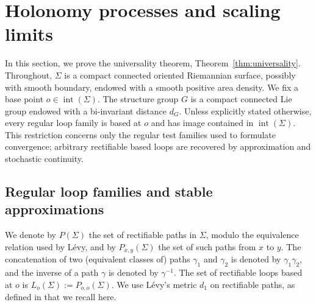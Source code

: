 \documentclass[11pt,a4paper,reqno]{article}
\theoremstyle{definition}
\theoremstyle{remark}
\begin{document}
\section{Holonomy processes and scaling limits}
\label{sec:loop-space-regular-processes}

In this section, we prove the universality theorem, Theorem~\ref{thm:universality}. Throughout, $\Sigma$ is a compact connected oriented Riemannian surface, possibly with smooth boundary, endowed with a smooth positive area density. We fix a base point $o\in\operatorname{int}(\Sigma).$ The structure group $G$ is a compact connected Lie group endowed with a bi-invariant distance $d_G$. Unless explicitly stated otherwise, every regular loop family is based at $o$ and has image contained in $\operatorname{int}(\Sigma)$. This restriction concerns only the regular test families used to formulate convergence; arbitrary rectifiable based loops are recovered by approximation and stochastic continuity.

\subsection{Regular loop families and stable approximations}

We denote by $P(\Sigma)$ the set of rectifiable paths in $\Sigma$, modulo the equivalence relation used by L\'evy, and by $P_{x,y}(\Sigma)$ the set of such paths from $x$ to $y$. The concatenation of two (equivalent classes of) paths $\gamma_1$ and $\gamma_2$ is denoted by $\gamma_1\gamma_2$, and the inverse of a path $\gamma$ is denoted by $\gamma^{-1}$. The set of rectifiable loops based at $o$ is $L_o(\Sigma):=P_{o,o}(\Sigma).$ We use L\'evy's metric $d_1$ on rectifiable paths, as defined in \cite[Section~1.2.2]{Lev10} that we recall here.
\end{document}
